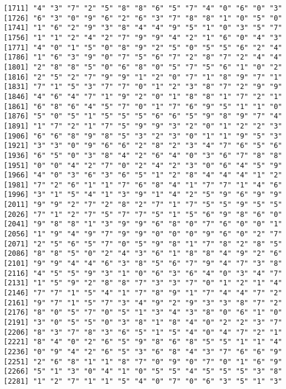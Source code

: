 \documentclass{article}
\begin{document}
\begin{itemize}
\begin{scriptsize}
\begin{verbatim}
[1711] "4" "3" "7" "2" "5" "8" "8" "6" "5" "7" "4" "0" "6" "0" "3"
[1726] "6" "3" "0" "9" "6" "2" "6" "3" "7" "8" "8" "1" "0" "5" "0"
[1741] "1" "6" "2" "9" "3" "8" "4" "4" "9" "5" "1" "0" "3" "5" "7"
[1756] "1" "1" "2" "4" "2" "7" "9" "9" "4" "2" "1" "6" "0" "4" "3"
[1771] "4" "0" "1" "5" "0" "8" "9" "2" "5" "0" "5" "5" "6" "2" "4"
[1786] "1" "6" "3" "9" "0" "7" "5" "6" "7" "2" "8" "7" "2" "4" "4"
[1801] "2" "8" "8" "5" "0" "6" "8" "0" "5" "7" "5" "6" "1" "0" "2"
[1816] "2" "5" "2" "7" "9" "9" "1" "2" "0" "7" "1" "8" "9" "7" "1"
[1831] "7" "1" "5" "3" "7" "7" "0" "1" "2" "3" "8" "7" "2" "9" "9"
[1846] "4" "6" "4" "7" "1" "9" "2" "0" "1" "8" "8" "1" "7" "2" "1"
[1861] "6" "8" "6" "4" "5" "7" "0" "1" "7" "6" "9" "5" "1" "1" "0"
[1876] "5" "0" "5" "1" "5" "5" "5" "6" "6" "5" "9" "8" "9" "7" "4"
[1891] "1" "7" "2" "1" "7" "5" "9" "9" "3" "2" "0" "1" "2" "2" "3"
[1906] "6" "6" "8" "9" "8" "5" "3" "2" "3" "0" "1" "1" "9" "5" "3"
[1921] "3" "3" "0" "9" "6" "6" "2" "8" "2" "3" "4" "7" "6" "5" "6"
[1936] "6" "5" "0" "3" "8" "4" "2" "6" "4" "0" "3" "6" "7" "8" "8"
[1951] "0" "0" "4" "2" "7" "0" "2" "4" "2" "3" "0" "6" "4" "5" "9"
[1966] "4" "0" "3" "6" "3" "6" "5" "1" "2" "8" "4" "4" "4" "1" "2"
[1981] "7" "2" "6" "1" "1" "7" "6" "8" "4" "1" "7" "7" "1" "4" "6"
[1996] "3" "1" "5" "4" "1" "3" "9" "1" "4" "2" "5" "9" "6" "9" "9"
[2011] "9" "9" "2" "7" "2" "8" "2" "7" "1" "7" "5" "5" "9" "5" "5"
[2026] "7" "1" "2" "7" "5" "7" "7" "5" "1" "5" "6" "9" "8" "6" "0"
[2041] "9" "8" "8" "1" "3" "9" "9" "6" "8" "0" "7" "6" "0" "0" "1"
[2056] "1" "9" "4" "9" "7" "9" "9" "0" "0" "0" "9" "6" "0" "2" "7"
[2071] "2" "5" "6" "5" "7" "0" "5" "9" "8" "1" "7" "8" "2" "8" "5"
[2086] "8" "8" "5" "0" "2" "4" "3" "6" "1" "8" "8" "4" "9" "2" "6"
[2101] "9" "9" "4" "4" "6" "3" "8" "5" "6" "7" "9" "4" "7" "3" "8"
[2116] "4" "5" "5" "9" "3" "1" "0" "6" "3" "6" "4" "0" "3" "4" "7"
[2131] "1" "5" "9" "2" "8" "8" "7" "3" "3" "7" "0" "1" "2" "1" "4"
[2146] "7" "7" "1" "5" "4" "1" "7" "8" "9" "1" "7" "4" "4" "7" "2"
[2161] "9" "7" "1" "5" "7" "3" "4" "9" "2" "9" "3" "3" "8" "7" "2"
[2176] "8" "0" "5" "7" "0" "5" "1" "3" "4" "3" "8" "0" "6" "1" "0"
[2191] "3" "0" "5" "5" "0" "3" "8" "1" "8" "4" "0" "2" "2" "3" "7"
[2206] "8" "3" "7" "8" "3" "6" "5" "1" "5" "4" "0" "4" "7" "2" "1"
[2221] "8" "4" "0" "2" "6" "5" "9" "8" "6" "8" "5" "5" "1" "1" "4"
[2236] "0" "9" "4" "2" "6" "5" "3" "6" "8" "4" "3" "7" "6" "6" "9"
[2251] "2" "6" "8" "1" "1" "8" "7" "0" "9" "0" "7" "0" "1" "6" "9"
[2266] "5" "1" "3" "0" "4" "1" "0" "5" "5" "4" "5" "5" "5" "3" "8"
[2281] "1" "2" "7" "1" "1" "5" "4" "0" "7" "0" "6" "3" "5" "1" "3"

\end{verbatim}
\end{scriptsize}
\end{itemize}
\end{document}
